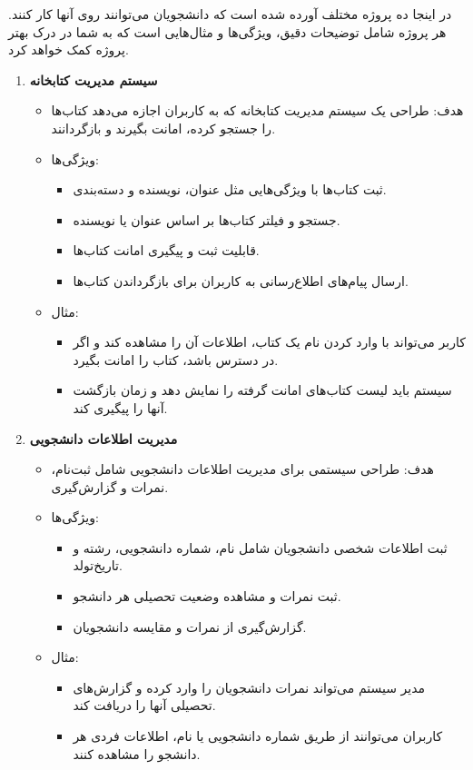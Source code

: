 \documentclass[b5paper,12pt]{article}
\begin{document}
		در اینجا ده پروژه مختلف آورده شده است که دانشجویان می‌توانند روی آنها کار کنند. هر پروژه شامل توضیحات دقیق، ویژگی‌ها و مثال‌هایی است که به شما در درک بهتر پروژه کمک خواهد کرد.
		
		\begin{enumerate}
			
			\item \textbf{سیستم مدیریت کتابخانه}
			\begin{itemize}
				\item هدف: طراحی یک سیستم مدیریت کتابخانه که به کاربران اجازه می‌دهد کتاب‌ها را جستجو کرده، امانت بگیرند و بازگردانند.
				\item ویژگی‌ها:
				\begin{itemize}
					\item ثبت کتاب‌ها با ویژگی‌هایی مثل عنوان، نویسنده و دسته‌بندی.
					\item جستجو و فیلتر کتاب‌ها بر اساس عنوان یا نویسنده.
					\item قابلیت ثبت و پیگیری امانت کتاب‌ها.
					\item ارسال پیام‌های اطلاع‌رسانی به کاربران برای بازگرداندن کتاب‌ها.
				\end{itemize}
				\item مثال:
				\begin{itemize}
					\item کاربر می‌تواند با وارد کردن نام یک کتاب، اطلاعات آن را مشاهده کند و اگر در دسترس باشد، کتاب را امانت بگیرد.
					\item سیستم باید لیست کتاب‌های امانت گرفته را نمایش دهد و زمان بازگشت آنها را پیگیری کند.
				\end{itemize}
			\end{itemize}
			
			\item \textbf{مدیریت اطلاعات دانشجویی}
			\begin{itemize}
				\item هدف: طراحی سیستمی برای مدیریت اطلاعات دانشجویی شامل ثبت‌نام، نمرات و گزارش‌گیری.
				\item ویژگی‌ها:
				\begin{itemize}
					\item ثبت اطلاعات شخصی دانشجویان شامل نام، شماره دانشجویی، رشته و تاریخ‌تولد.
					\item ثبت نمرات و مشاهده وضعیت تحصیلی هر دانشجو.
					\item گزارش‌گیری از نمرات و مقایسه دانشجویان.
				\end{itemize}
				\item مثال:
				\begin{itemize}
					\item مدیر سیستم می‌تواند نمرات دانشجویان را وارد کرده و گزارش‌های تحصیلی آنها را دریافت کند.
					\item کاربران می‌توانند از طریق شماره دانشجویی یا نام، اطلاعات فردی هر دانشجو را مشاهده کنند.
				\end{itemize}
			\end{itemize}
			

\end{enumerate}
\end{document}

